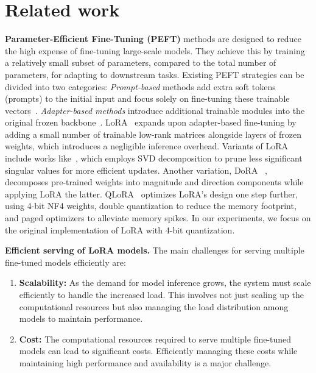 \section{Related work}

\textbf{Parameter-Efficient Fine-Tuning (PEFT)} methods are designed to reduce the high expense of fine-tuning large-scale models. They achieve this by training a relatively small subset of parameters, compared to the total number of parameters, for adapting to downstream tasks. Existing PEFT strategies can be divided into two categories: \textit{Prompt-based} methods add extra soft tokens (prompts) to the initial input and focus solely on fine-tuning these trainable vectors~\cite{26lester2021prompttuning, Razdaibiedina2023progressiveprompts, wang2021learningtoprompt}. \textit{Adapter-based methods} introduce additional trainable modules into the original frozen backbone~\cite{13houlsby2019peft, 22rebuffi2017residualadapters, 23pfeiffer2020adapterfusion, 24ruckle2020adapterdrop}. LoRA~\cite{1hu2021lora} expands upon adapter-based fine-tuning by adding a small number of trainable low-rank matrices alongside layers of frozen weights, which introduces a negligible inference overhead. Variants of LoRA include works like~\cite{meng2024periodiclora}, which employs SVD decomposition to prune less significant singular values for more efficient updates. Another variation, DoRA ~\cite{dora}, decomposes pre-trained weights into magnitude and direction components while applying LoRA the latter. QLoRA~\cite{11dettmers2023qlora} optimizes LoRA’s design one step further, using 4-bit NF4 weights, double quantization to reduce the memory footprint, and paged optimizers to alleviate memory spikes. In our experiments, we focus on the original implementation of LoRA with 4-bit quantization.

\textbf{Efficient serving of LoRA models.} The main challenges for serving multiple fine-tuned models efficiently are:

\begin{enumerate}
\item \textbf{Scalability:} As the demand for model inference grows, the system must scale efficiently to handle the increased load. This involves not just scaling up the computational resources but also managing the load distribution among models to maintain performance.

\item \textbf{Cost:} The computational resources required to serve multiple fine-tuned models can lead to significant costs. Efficiently managing these costs while maintaining high performance and availability is a major challenge.

\end{enumerate}

